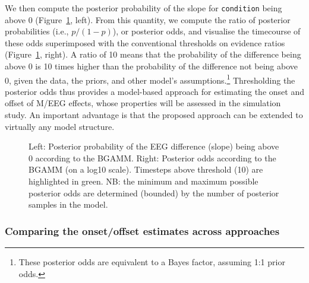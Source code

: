 \documentclass[
  doc,
  floatsintext,
  longtable,
  a4paper,
  nolmodern,
  notxfonts,
  notimes,
  colorlinks=true,linkcolor=blue,citecolor=blue,urlcolor=blue]{apa7}
\begin{document}
We then compute the posterior probability of the slope for
\texttt{condition} being above \(0\) (Figure~\ref{fig-post-prob-ratio},
left). From this quantity, we compute the ratio of posterior
probabilities (i.e., \(p/(1-p)\)), or posterior odds, and visualise the
timecourse of these odds superimposed with the conventional thresholds
on evidence ratios (Figure~\ref{fig-post-prob-ratio}, right). A ratio of
10 means that the probability of the difference being above 0 is 10
times higher than the probability of the difference not being above 0,
given the data, the priors, and other model's assumptions.\footnote{These
  posterior odds are equivalent to a Bayes factor, assuming 1:1 prior
  odds.} Thresholding the posterior odds thus provides a model-based
approach for estimating the onset and offset of M/EEG effects, whose
properties will be assessed in the simulation study. An important
advantage is that the proposed approach can be extended to virtually any
model structure.

\begin{figure}[!htb]

\caption{\label{fig-post-prob-ratio}Left: Posterior probability of the
EEG difference (slope) being above 0 according to the BGAMM. Right:
Posterior odds according to the BGAMM (on a log10 scale). Timesteps
above threshold (10) are highlighted in green. NB: the minimum and
maximum possible posterior odds are determined (bounded) by the number
of posterior samples in the model.}


\end{figure}%

\subsubsection{Comparing the onset/offset estimates across
approaches}\label{comparing-the-onsetoffset-estimates-across-approaches}
\end{document}
